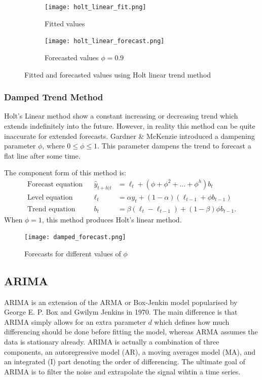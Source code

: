 \documentclass{article}
\begin{document}
  \begin{figure}[H]
    \centering
    \captionsetup{justification=centering}
    \begin{subfigure}[b]{0.49\linewidth}
      \texttt{[image: holt\_linear\_fit.png]}
      \caption{Fitted values}
    \end{subfigure}
    \begin{subfigure}[b]{0.49\linewidth}
      \texttt{[image: holt\_linear\_forecast.png]}
      \caption{Forecasted values $\phi=0.9$}
    \end{subfigure}
    \caption{Fitted and forecasted values using Holt linear trend method}
  \end{figure}

  \subsubsection*{Damped Trend Method}
  Holt's Linear method show a constant increasing or decreasing trend which extends indefinitely into the future. However, in reality this method can be quite inaccurate for extended forecasts. Gardner \& McKenzie introduced a dampening parameter $\phi$, where $0 \le \phi \le 1$. This parameter dampens the trend to forecast a flat line after some time.

  The component form of this method is:
  \begin{align*}
    \text{Forecast equation}&& \hat{y}_{t+h|t} &= \ell_{t} + (\phi+\phi^2+...+\phi^h)b_{t} \\
    \text{Level equation}   && \ell_{t} &= \alpha y_{t} + (1 - \alpha)(\ell_{t-1} + \phi b_{t-1})\\
    \text{Trend equation}   && b_{t}    &= \beta(\ell_{t} - \ell_{t-1}) + (1 -\beta)\phi b_{t-1}.
  \end{align*}
  When $\phi=1$, this method produces Holt's linear method.

  \begin{figure}[H]
    \centering
    \captionsetup{justification=centering}
    \texttt{[image: damped\_forecast.png]}
    \caption{Forecasts for different values of $\phi$}
  \end{figure}

  \subsection{ARIMA}
    ARIMA is an extension of the ARMA or Box-Jenkin model popularised by George E. P. Box and Gwilym Jenkins in 1970. The main difference is that ARIMA simply allows for an extra parameter $d$ which defines how much differencing should be done before fitting the model, whereas ARMA assumes the data is stationary already. 
    ARIMA is actually a combination of three components, an autoregressive model (AR), a moving averages model (MA), and an integrated (I) part denoting the order of differencing. The ultimate goal of ARIMA is to filter the noise and extrapolate the signal wihtin a time series.
  
\end{document}
